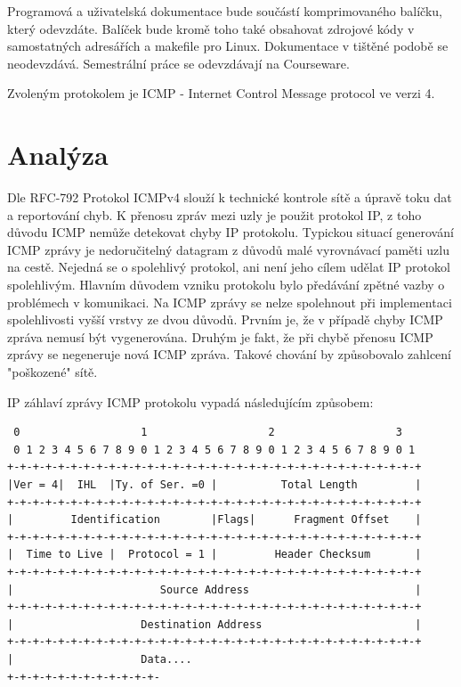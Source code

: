 \documentclass[12pt, a4paper]{article}
\begin{document}
Programová a uživatelská dokumentace bude součástí komprimovaného balíčku, který odevzdáte. Balíček bude kromě toho také obsahovat zdrojové kódy v samostatných adresářích a makefile pro Linux. Dokumentace v tištěné podobě se neodevzdává. Semestrální práce se odevzdávají na Courseware.

Zvoleným protokolem je ICMP - Internet Control Message protocol ve verzi 4.
\newpage

\section{Analýza}

Dle RFC-792 Protokol ICMPv4 slouží k technické kontrole sítě a úpravě toku dat a reportování chyb. K přenosu zpráv mezi uzly je použit protokol IP, z toho důvodu ICMP nemůže detekovat chyby IP protokolu. Typickou situací generování ICMP zprávy je nedoručitelný datagram z důvodů malé vyrovnávací paměti uzlu na cestě. Nejedná se o spolehlivý protokol, ani není jeho cílem udělat IP protokol spolehlivým. Hlavním důvodem vzniku protokolu bylo předávání zpětné vazby o problémech v komunikaci. Na ICMP zprávy se nelze spolehnout při implementaci spolehlivosti vyšší vrstvy ze dvou důvodů. Prvním je, že v případě chyby ICMP zpráva nemusí být vygenerována. Druhým je fakt, že při chybě přenosu ICMP zprávy se negeneruje nová ICMP zpráva. Takové chování by způsobovalo zahlcení "poškozené" sítě.

IP záhlaví zprávy ICMP protokolu vypadá následujícím způsobem:

\begin{verbatim}
 0                   1                   2                   3
 0 1 2 3 4 5 6 7 8 9 0 1 2 3 4 5 6 7 8 9 0 1 2 3 4 5 6 7 8 9 0 1
+-+-+-+-+-+-+-+-+-+-+-+-+-+-+-+-+-+-+-+-+-+-+-+-+-+-+-+-+-+-+-+-+
|Ver = 4|  IHL  |Ty. of Ser. =0 |          Total Length         |
+-+-+-+-+-+-+-+-+-+-+-+-+-+-+-+-+-+-+-+-+-+-+-+-+-+-+-+-+-+-+-+-+
|         Identification        |Flags|      Fragment Offset    |
+-+-+-+-+-+-+-+-+-+-+-+-+-+-+-+-+-+-+-+-+-+-+-+-+-+-+-+-+-+-+-+-+
|  Time to Live |  Protocol = 1 |         Header Checksum       |
+-+-+-+-+-+-+-+-+-+-+-+-+-+-+-+-+-+-+-+-+-+-+-+-+-+-+-+-+-+-+-+-+
|                       Source Address                          |
+-+-+-+-+-+-+-+-+-+-+-+-+-+-+-+-+-+-+-+-+-+-+-+-+-+-+-+-+-+-+-+-+
|                    Destination Address                        |
+-+-+-+-+-+-+-+-+-+-+-+-+-+-+-+-+-+-+-+-+-+-+-+-+-+-+-+-+-+-+-+-+
|                    Data....                                  
+-+-+-+-+-+-+-+-+-+-+-+-

\end{verbatim}
\end{document}
